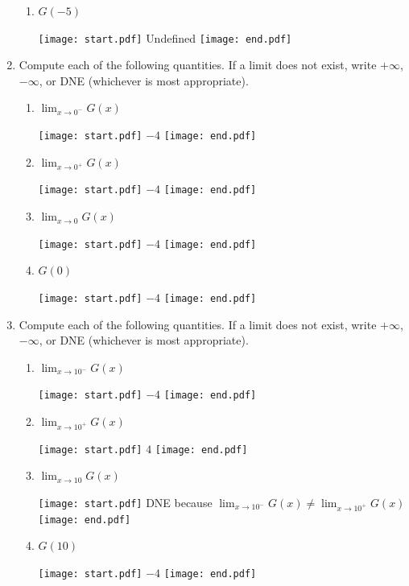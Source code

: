 \documentclass[12pt]{article}
\begin{document}
\begin{enumerate}
\begin{enumerate}
\item $G(-5)$

\texttt{[image: start.pdf]}
{{Undefined}}
\texttt{[image: end.pdf]}


\end{enumerate}

\item Compute each of the following quantities.  If a limit does not exist, write $+\infty$, $-\infty$, or DNE (whichever is most appropriate). 

\begin{enumerate}

\item $\displaystyle \lim_{x \rightarrow 0^{-}}{G(x)}$

\texttt{[image: start.pdf]}
{{$-4$}}
\texttt{[image: end.pdf]}


\item $\displaystyle \lim_{x \rightarrow 0^{+}}{G(x)}$

\texttt{[image: start.pdf]}
{{$-4$}}
\texttt{[image: end.pdf]}


\item $\displaystyle \lim_{x \rightarrow 0}{G(x)}$

\texttt{[image: start.pdf]}
{{$-4$}}
\texttt{[image: end.pdf]}


\item $G(0)$

\texttt{[image: start.pdf]}
{{$-4$}}
\texttt{[image: end.pdf]}


\end{enumerate}

\newpage

\item Compute each of the following quantities.  If a limit does not exist, write $+\infty$, $-\infty$, or DNE (whichever is most appropriate). 

\begin{enumerate}

\item $\displaystyle \lim_{x \rightarrow 10^{-}}{G(x)}$

\texttt{[image: start.pdf]}
{{$-4$}}
\texttt{[image: end.pdf]}


\item $\displaystyle \lim_{x \rightarrow 10^{+}}{G(x)}$

\texttt{[image: start.pdf]}
{{$4$}}
\texttt{[image: end.pdf]}


\item $\displaystyle \lim_{x \rightarrow 10}{G(x)}$

\texttt{[image: start.pdf]}
{{DNE because $\displaystyle \lim_{x \rightarrow 10^{-}}{G(x)} \neq \lim_{x \rightarrow 10^{+}}{G(x)}$}}
\texttt{[image: end.pdf]}


\item $G(10)$

\texttt{[image: start.pdf]}
{{$-4$}}
\texttt{[image: end.pdf]}


\end{enumerate}

\end{enumerate}
\end{document}
